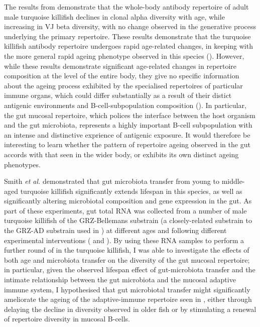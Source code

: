 The results from  demonstrate that the whole-body antibody repertoire of adult male turquoise killifish declines in clonal alpha diversity with age, while increasing in VJ beta diversity, with no change observed in the generative process underlying the primary repertoire. These results demonstrate that the turquoise killifish antibody repertoire undergoes rapid age-related changes, in keeping with the more general rapid ageing phenotype observed in this species (). However, while these results demonstrate significant age-related changes in repertoire composition at the level of the entire body, they give no specific information about the ageing process exhibited by the specialised repertoires of particular immune organs, which could differ substantially as a result of their distict antigenic environments and B-cell-subpopulation composition (). In particular, the gut mucosal repertoire, which polices the interface between the host organism and the gut microbiota, represents a highly important B-cell subpopulation with an intense and distinctive exprience of antigenic exposure. It would therefore be interesting to learn whether the pattern of repertoire ageing observed in the gut accords with that seen in the wider body, or exhibits its own distinct ageing phenotypes.

Smith \textit{et al.} \parencite{smith2017microbiota} demonstrated that gut microbiota transfer from young to middle-aged turquoise killifish significantly extends lifespan in this species, as well as significantly altering microbiotal composition and gene expression in the gut. As part of these experiments, gut total RNA was collected from a number of male turquoise killifish of the GRZ-Bellemans substrain (a closely-related substrain to the GRZ-AD substrain used in ) at different ages and following different experimental interventions ( and ). By using these RNA samples to perform a further round of \Igseq in the turquoise killifish, I was able to investigate the effects of both age and microbiota transfer on the diversity of the gut mucosal repertoire; in particular, given the observed lifespan effect of gut-microbiota transfer and the intimate relationship between the gut microbiota and the mucosal adaptive immune system, I hypothesised that gut microbiotal transfer might significantly ameliorate the ageing of the adaptive-immune repertoire seen in , either through delaying the decline in diversity observed in older fish or by stimulating a renewal of repertoire diversity in mucosal B-cells.

